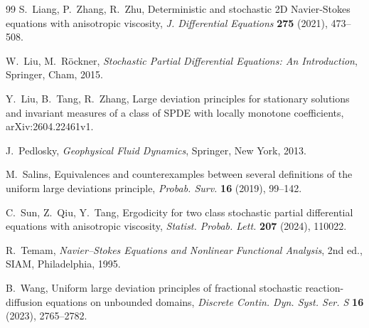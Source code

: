 \documentclass[11pt,a4paper,reqno]{amsart}
\theoremstyle{definition}
\begin{document}
\begin{thebibliography}{99}
 S.~Liang, P.~Zhang, R.~Zhu, Deterministic and stochastic 2D Navier-Stokes equations
  with anisotropic viscosity, \emph{J. Differential Equations} \textbf{275} (2021), 473--508.

 W.~Liu, M.~R{\"o}ckner, \emph{Stochastic Partial Differential Equations: An Introduction},
  Springer, Cham, 2015.

 Y.~Liu, B.~Tang, R.~Zhang, Large deviation principles for stationary solutions and invariant
measures of a class of SPDE with locally monotone coefficients, arXiv:2604.22461v1.

 J.~Pedlosky, \emph{Geophysical Fluid Dynamics},  Springer, New York, 2013.

 M.~Salins, Equivalences and counterexamples between several definitions of the uniform
  large deviations principle, \emph{Probab. Surv.} \textbf{16} (2019), 99--142.

 C.~Sun, Z.~Qiu, Y.~Tang, Ergodicity for two class stochastic partial differential
  equations with anisotropic viscosity, \emph{Statist. Probab. Lett.} \textbf{207} (2024), 110022.

 R.~Temam, \emph{Navier--Stokes Equations and Nonlinear Functional Analysis}, 2nd ed., SIAM, Philadelphia, 1995.

 B.~Wang, Uniform large deviation principles of fractional stochastic reaction-diffusion
  equations on unbounded domains, \emph{Discrete Contin. Dyn. Syst. Ser. S} \textbf{16} (2023), 2765--2782.


\end{thebibliography}
\end{document}
